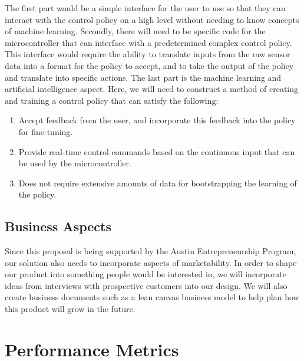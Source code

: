 \documentclass[letterpaper,10pt]{article}
\begin{document}
The first part would be a simple interface for the user to use so that they can interact with the control policy on a high level without needing to know concepts of machine learning.
Secondly, there will need to be specific code for the microcontroller that can interface with a predetermined complex control policy.
This interface would require the ability to translate inputs from the raw sensor data into a format for the policy to accept, and to take the  output of the policy and translate into specific actions.
The last part is the machine learning and artificial intelligence aspect.
Here, we will need to construct a method of creating and training a control policy that can satisfy the following:
\begin{enumerate}
	\item Accept feedback from the user, and incorporate this feedback into the policy for fine-tuning.
	\item Provide real-time control commands based on the continuous input that can be used by the microcontroller.
	\item Does not require extensive amounts of data for bootstrapping the learning of the policy.
\end{enumerate}

\subsection{Business Aspects}
Since this proposal is being supported by the Austin Entrepreneurship Program, our solution also needs to incorporate aspects of marketability.
In order to shape our product into something people would be interested in, we will incorporate ideas from interviews with prospective customers into our design.
We will also create business documents such as a lean canvas business model to help plan how this product will grow in the future.

\section{Performance Metrics}
\end{document}
